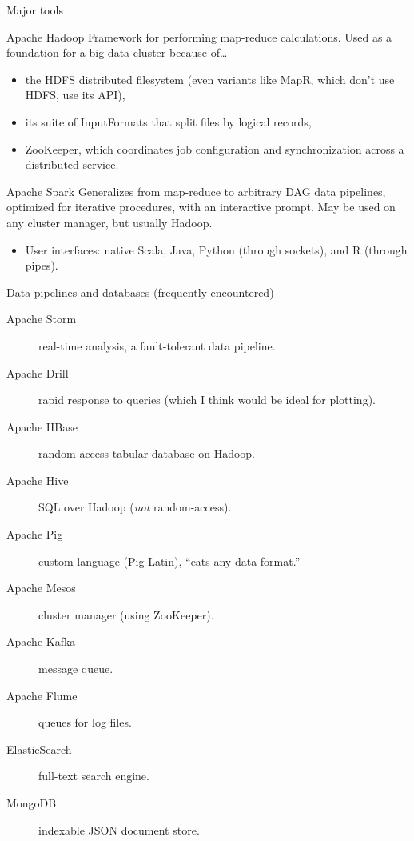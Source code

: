 \documentclass{beamer}
\begin{document}

\begin{frame}{Major tools}
\begin{block}{Apache Hadoop}
Framework for performing map-reduce calculations. Used as a foundation for a big data cluster because of\ldots
\begin{itemize}
\item the HDFS distributed filesystem (even variants like MapR, which don't use HDFS, use its API),
\item its suite of InputFormats that split files by logical records,
\item ZooKeeper, which coordinates job configuration and synchronization across a distributed service.
\end{itemize}
\end{block}

\begin{block}{Apache Spark}
Generalizes from map-reduce to arbitrary DAG data pipelines, optimized for iterative procedures, with an interactive prompt. May be used on any cluster manager, but usually Hadoop.
\begin{itemize}
\item User interfaces: native Scala, Java, Python (through sockets), and R (through pipes).
\end{itemize}
\end{block}
\end{frame}

\begin{frame}{Data pipelines and databases (frequently encountered)}
\begin{description}
\item[Apache Storm] real-time analysis, a fault-tolerant data pipeline.
\item[Apache Drill] rapid response to queries (which I think would be ideal for plotting).
\item[Apache HBase] random-access tabular database on Hadoop.
\item[Apache Hive] SQL over Hadoop ({\it not} random-access).
\item[Apache Pig] custom language (Pig Latin), ``eats any data format.''
\item[Apache Mesos] cluster manager (using ZooKeeper).
\item[Apache Kafka] message queue.
\item[Apache Flume] queues for log files.
\item[ElasticSearch] full-text search engine.
\item[MongoDB] indexable JSON document store.
\end{description}
\end{frame}
\end{document}
